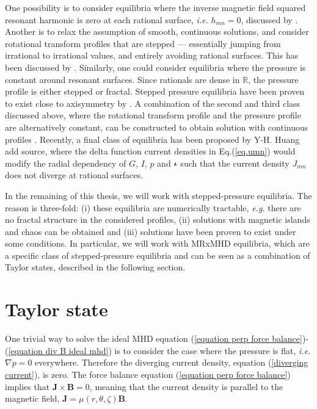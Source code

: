 \documentclass[my_thesis.tex]{subfiles}
\begin{document}
One possibility is to consider equilibria where the inverse magnetic field squared resonant harmonic is zero at each rational surface, \emph{i.e.} $h_{mn}=0$, discussed by \citet{Weitzner2014}. Another is to relax the assumption of smooth, continuous solutions, and consider rotational transform profiles that are stepped --- essentially jumping from irrational to irrational values, and entirely avoiding rational surfaces. This has been discussed by \citet{Loizu2015a}. Similarly, one could consider equilibria where the pressure is constant around resonant surfaces. Since rationals are dense in $\mathbb{R}$, the pressure profile is either stepped or fractal. Stepped pressure equilibria have been proven to exist close to axisymmetry by \citet{Bruno1996}. A combination of the second and third class discussed above, where the rotational transform profile and the pressure profile are alternatively constant, can be constructed to obtain solution with continuous profiles \citep{Hudson2017a}. Recently, a final class of equilibria has been proposed by Y-H. Huang {\color{red} add source}, where the delta function current densities in Eq.(\ref{eq.umn}) would modify the radial dependency of $G$, $I$, $p$ and $\text{$\iota\!\!$-}$ such that the current density $J_{mn}$ does not diverge at rational surfaces.

In the remaining of this thesis, we will work with stepped-pressure equilibria. The reason is three-fold: (i) these equilibria are numerically tractable, \textit{e.g.} there are no fractal structure in the considered profiles, (ii) solutions with magnetic islands and chaos can be obtained and (iii) solutions have been proven to exist under some conditions. In particular, we will work with \ac{MRxMHD} equilibria, which are a specific class of stepped-pressure equilibria and can be seen as a combination of Taylor states, described in the following section.



\section{Taylor state}
\label{section taylor state}
One trivial way to solve the ideal MHD equation (\ref{equation perp force balance})-(\ref{equation div B ideal mhd}) is to consider the case where the pressure is flat, \textit{i.e.} $\nabla p=0$ everywhere. Therefore the diverging current density, equation (\ref{diverging current}), is zero. The force balance equation (\ref{equation perp force balance}) implies that $\mathbf{J}\times\mathbf{B}=0$, meaning that the current density is parallel to the magnetic field, $\mathbf{J}=\mu(r,\theta,\zeta)\mathbf{B}$.
\end{document}
